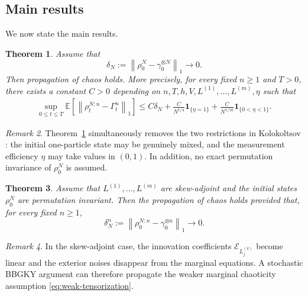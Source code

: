 \documentclass[10pt,a4paper,reqno]{amsart}
\numberwithin{equation}{section}
\theoremstyle{plain}
\newtheorem{theorem}{Theorem}[section]
\theoremstyle{definition}
\theoremstyle{remark}
\newtheorem{remark}[theorem]{Remark}
\newcommand{\E}{\mathbb E}
\newcommand{\cE}{\mathcal E}
\newcommand{\1}{\mathbf 1}
\begin{document}
\subsection{Main results}
\label{subsec:main-results}

We now state the main results.  

\begin{theorem}
\label{thm:main-approx}
Assume that
\begin{equation}
  \delta_N
  :=
  \left\|
    \rho_0^N-\gamma_0^{\otimes N}
  \right\|_1
  \longrightarrow0.
  \label{eq:strong-tensorization}
\end{equation}
Then propagation of chaos holds.  More precisely, for every fixed $n\ge1$ and
$T>0$, there exists a constant $C>0$ depending on $n, T,  h,V,L^{(1)},\ldots,L^{(m)},\eta $ 
such that
\begin{equation}
\begin{aligned}
  \sup_{0\le t\le T}
  \E\left[
    \left\|
      \rho_t^{N:n}
      -
      \Gamma_t^n
    \right\|_1
  \right]
   \le C\delta_N+ 
     \frac{C}{N^{1/4}}{\mathbf 1}_{\{\eta=1\}} + \frac{C}{N^{1/16}}{\mathbf 1}_{\{0<\eta<1\}}.
\end{aligned}
  \label{eq:main-approx-bound}
\end{equation}
\end{theorem}

\begin{remark}
Theorem~\ref{thm:main-approx}  simultaneously removes the two restrictions in Kolokoltsov 
\citep{kolokoltsov2021,kolokoltsov2022}: the initial one-particle state may
be genuinely mixed, and the measurement efficiency $\eta$ may take values in 
$(0,1)$.  In addition,  no exact permutation invariance of $\rho_0^N$ is assumed.
\end{remark}


\begin{theorem}
\label{thm:main-anti}
Assume that $L^{(1)},\ldots, L^{(m)}$ are skew-adjoint and 
 the initial states $\rho^N_0$ are permutation invariant.  Then the propagation of chaos holds provided that,  for every fixed $n\ge 1$, 
\begin{equation}
  \delta_{N}^n
  :=
  \left\|
    \rho_0^{N:n}-\gamma_0^{\otimes n}
  \right\|_1
  \longrightarrow 0.
  \label{eq:weak-tensorization}
\end{equation}
\end{theorem}

\begin{remark}
In the skew-adjoint case, the innovation coefficients $\cE_{L_j^{(k)}}$ become linear and the
exterior noises disappear from the marginal equations.  A stochastic BBGKY
argument can therefore propagate the weaker marginal chaoticity assumption
\eqref{eq:weak-tensorization}.
\end{remark}
\end{document}
